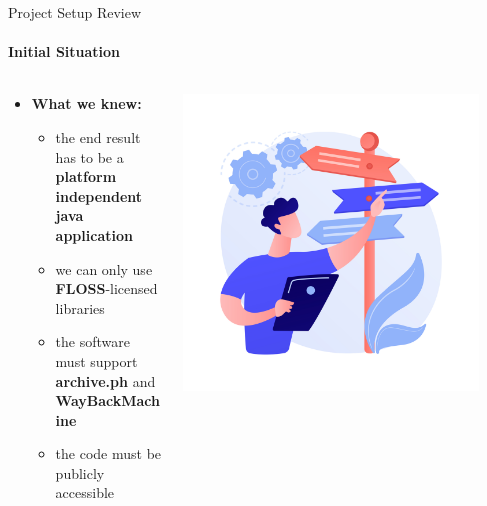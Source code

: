 \documentclass[
    ngerman,%
    authorontitle=true,
]{bfhbeamer}
\begin{document}
    \begin{frame}{Project Setup Review}
        \framesubtitle{Initial Situation}
    	\begin{columns} %
    		\begin{column}{0.7\textwidth} %
    			\begin{itemize}
    				\item \textbf{What we knew:}
    				\begin{itemize}
                        \item the end result has to be a \textbf{platform independent java application}
    				    \item we can only use \textbf{FLOSS}-licensed libraries 
    				    \item the software must support \textbf{archive.ph} and \textbf{WayBackMachine}
    				    \item the code must be publicly accessible
                    \end{itemize}
    				
    			\end{itemize}
    		\end{column}
    		\begin{column}{0.3\textwidth} %
	    		\begin{center}
	    			\includegraphics[width=0.9\textwidth]{pictures/final_presentation/initial_situation.jpg}
	    		\end{center}
    		\end{column}
    	\end{columns}
    \end{frame}
\end{document}
